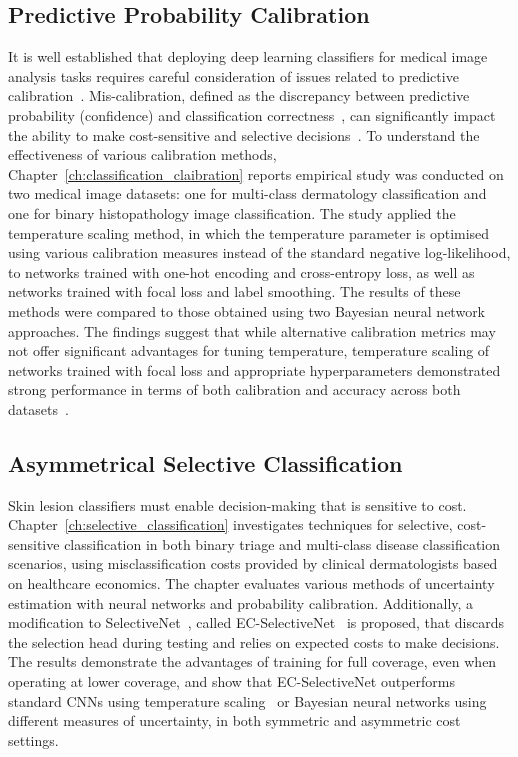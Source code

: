 \subsection*{Predictive Probability Calibration}
It is well established that deploying deep learning classifiers for medical image analysis tasks requires careful consideration of issues related to predictive calibration~\citep{maron2019systematic}. Mis-calibration, defined as the discrepancy between predictive probability (confidence) and classification correctness~\citep{guo2017calibration}, can significantly impact the ability to make cost-sensitive and selective decisions~\citep{carse2021robust}. To understand the effectiveness of various calibration methods, Chapter~\ref{ch:classification_claibration} reports empirical study was conducted on two medical image datasets: one for multi-class dermatology classification and one for binary histopathology image classification. The study applied the temperature scaling method, in which the temperature parameter is optimised using various calibration measures instead of the standard negative log-likelihood, to networks trained with one-hot encoding and cross-entropy loss, as well as networks trained with focal loss and label smoothing. The results of these methods were compared to those obtained using two Bayesian neural network approaches. The findings suggest that while alternative calibration metrics may not offer significant advantages for tuning temperature, temperature scaling of networks trained with focal loss and appropriate hyperparameters demonstrated strong performance in terms of both calibration and accuracy across both datasets~\citep{carse2022calibration}.

\newpage
\subsection*{Asymmetrical Selective Classification}
Skin lesion classifiers must enable decision-making that is sensitive to cost. Chapter~\ref{ch:selective_classification} investigates techniques for selective, cost-sensitive classification in both binary triage and multi-class disease classification scenarios, using misclassification costs provided by clinical dermatologists based on healthcare economics. The chapter evaluates various methods of uncertainty estimation with neural networks and probability calibration. Additionally, a modification to SelectiveNet~\citep{geifman2019selectivenet}, called EC-SelectiveNet~\citep{carse2021robust} is proposed, that discards the selection head during testing and relies on expected costs to make decisions. The results demonstrate the advantages of training for full coverage, even when operating at lower coverage, and show that EC-SelectiveNet outperforms standard CNNs using temperature scaling~\citep{guo2017calibration} or Bayesian neural networks using different measures of uncertainty, in both symmetric and asymmetric cost settings.

